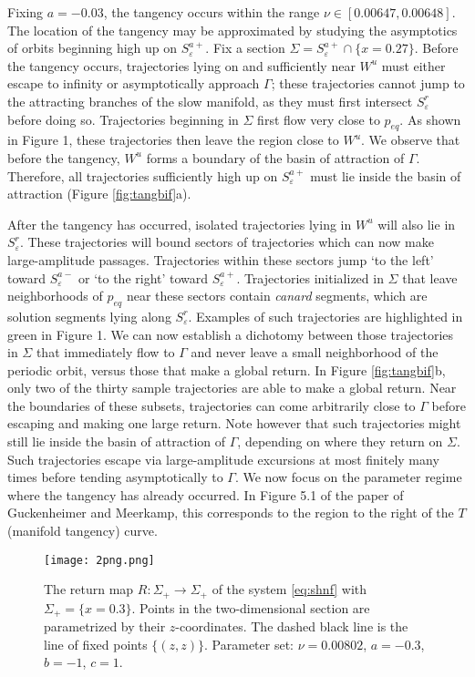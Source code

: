 \documentclass[aip, cha, sd, amsmath,amssymb, preprint]{revtex4-1}
\begin{document}
Fixing $a = -0.03$, the tangency occurs within the range $\nu \in \left[ 0.00647, 0.00648\right]$. The location of the tangency may be approximated by studying the asymptotics of orbits beginning high up on $S^{a+}_{ \varepsilon}$. Fix a section $\Sigma = S^{a+}_{ \varepsilon}\cap \{x = 0.27\}$.  Before the tangency occurs, trajectories lying on and sufficiently near $W^u$ must either escape to infinity or asymptotically approach $\Gamma$; these trajectories cannot jump to the attracting branches of the slow manifold, as they must first intersect $S^r_{ \varepsilon}$ before doing so. Trajectories beginning in $\Sigma$ first flow very close to $p_{eq}$. As shown in Figure 1, these trajectories then leave the region close to $W^u$. We observe that before the tangency, $W^u$ forms a boundary of the basin of attraction of $\Gamma$. Therefore, all trajectories sufficiently high up on $S^{a+}_{ \varepsilon}$ must lie inside the basin of attraction (Figure \ref{fig:tangbif}a).

After the tangency has occurred, isolated trajectories lying in $W^u$ will also lie in $S^r_{ \varepsilon}$. These trajectories will bound sectors of trajectories which can now make large-amplitude passages. Trajectories within these sectors jump `to the left' toward $S^{a-}_{ \varepsilon}$ or `to the right' toward $S^{a+}_{ \varepsilon}$. Trajectories initialized in $\Sigma$ that leave neighborhoods of $p_{eq}$ near these sectors contain {\it canard} segments, which are solution segments lying along $S^r_{ \varepsilon}$. Examples of such trajectories are highlighted in green in Figure 1. We can now establish a dichotomy between those trajectories in $\Sigma$ that immediately flow to $\Gamma$ and never leave a small neighborhood of the periodic orbit, versus those that make a global return. In Figure \ref{fig:tangbif}b, only two of the thirty sample trajectories are able to make a global return. Near the boundaries of these subsets, trajectories can come arbitrarily close to $\Gamma$ before escaping and making one large return. Note however that such trajectories might still lie inside the basin of attraction of $\Gamma$, depending on where they return on $\Sigma$. Such trajectories escape via large-amplitude excursions at most finitely many times before tending asymptotically to $\Gamma$.  We now focus on the parameter regime where the tangency has already occurred. In Figure 5.1 of the paper of Guckenheimer and Meerkamp, this corresponds to the region to the right of the $T$ (manifold tangency) curve.

\begin{figure}
\texttt{[image: 2png.png]}
\caption{\label{fig:retmap}   The return map $R: \Sigma_+ \to \Sigma_+$ of the system \eqref{eq:shnf} with $\Sigma_+ = \{x = 0.3\}$. Points in the two-dimensional section are parametrized by their $z$-coordinates. The dashed black line is the line of fixed points $\{(z,z)\}$. Parameter set: $\nu = 0.00802$, $a = -0.3$, $b = -1$, $c = 1$.}
\end{figure}
\end{document}
